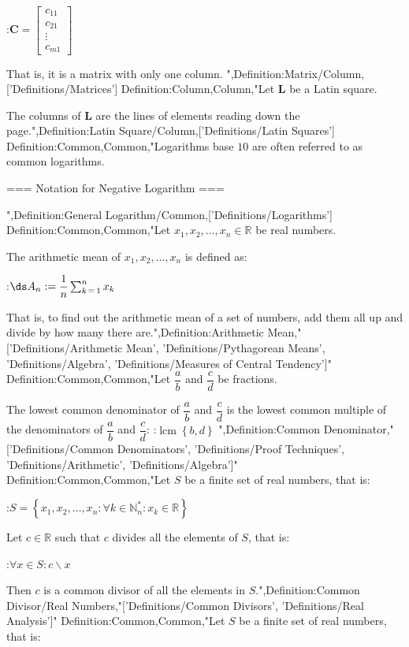 :$\mathbf C = \begin {bmatrix} c_{1 1} \\ c_{2 1} \\ \vdots \\ c_{m 1} \end {bmatrix}$


That is, it is a matrix with only one column.
",Definition:Matrix/Column,['Definitions/Matrices']
Definition:Column,Column,"Let $\mathbf L$ be a Latin square.

The columns of $\mathbf L$ are the lines of elements reading down the page.",Definition:Latin Square/Column,['Definitions/Latin Squares']
Definition:Common,Common,"Logarithms base $10$ are often referred to as common logarithms.


=== Notation for Negative Logarithm ===

",Definition:General Logarithm/Common,['Definitions/Logarithms']
Definition:Common,Common,"Let $x_1, x_2, \ldots, x_n \in \mathbb R$ be real numbers.

The arithmetic mean of $x_1, x_2, \ldots, x_n$ is defined as:

:$\ds A_n := \dfrac 1 n \sum_{k \mathop = 1}^n x_k$

That is, to find out the arithmetic mean of a set of numbers, add them all up and divide by how many there are.",Definition:Arithmetic Mean,"['Definitions/Arithmetic Mean', 'Definitions/Pythagorean Means', 'Definitions/Algebra', 'Definitions/Measures of Central Tendency']"
Definition:Common,Common,"Let $\dfrac a b$ and $\dfrac c d$ be fractions.

The lowest common denominator of $\dfrac a b$ and $\dfrac c d$ is the lowest common multiple of the denominators of $\dfrac a b$ and $\dfrac c d$:
:$\operatorname {lcm} \left\lbrace b, d \right\rbrace$
",Definition:Common Denominator,"['Definitions/Common Denominators', 'Definitions/Proof Techniques', 'Definitions/Arithmetic', 'Definitions/Algebra']"
Definition:Common,Common,"Let $S$ be a finite set of real numbers, that is:

:$S = \left\lbrace x_1, x_2, \ldots, x_n: \forall k \in \mathbb N^*_n: x_k \in \mathbb R \right\rbrace$


Let $c \in \mathbb R$ such that $c$ divides all the elements of $S$, that is:

:$\forall x \in S: c \mathrel \backslash x$


Then $c$ is a common divisor of all the elements in $S$.",Definition:Common Divisor/Real Numbers,"['Definitions/Common Divisors', 'Definitions/Real Analysis']"
Definition:Common,Common,"Let $S$ be a finite set of real numbers, that is:

